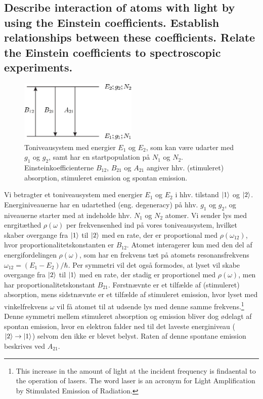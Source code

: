 \subsection{Describe interaction of atoms with light by using the Einstein coefficients. Establish relationships between these coefficients. Relate the Einstein coefficients to spectroscopic experiments.}


\begin{figure}[!h]
    \centering
    \includegraphics[width=0.5\textwidth]{Q02/images/TwoLevelSystem2.PNG}
    \caption{Toniveausystem med energier $E_1$ og $E_2$, som kan være udarter med $g_1$ og $g_2$, samt har en startpopulation på $N_1$ og $N_2$. Einsteinkoefficienterne $B_{12}$, $B_{21}$ og $A_{21}$ angiver hhv. (stimuleret) absorption, stimuleret emission og spontan emission.}
    \label{fig:Q02_TwoLevelSystem}
\end{figure}

Vi betragter et toniveausystem med energier $E_1$ og $E_2$ i hhv. tilstand $\ket{1}$ og $\ket{2}$. Energiniveauerne har en udartethed (eng. degeneracy) på hhv. $g_1$ og $g_2$, og niveauerne starter med at indeholde hhv. $N_1$ og $N_2$ atomer. Vi sender lys med enrgitæthed $\rho(\omega)$ per frekvensenhed ind på vores toniveausystem, hvilket skaber overgange fra $\ket{1}$ til $\ket{2}$ med en rate, der er proportional med $\rho(\omega_{12})$, hvor proportionalitetskonstanten er $B_{12}$. Atomet interagerer kun med den del af energifordelingen $\rho(\omega)$, som har en frekvens tæt på atomets \textsf{resonansfrekvens} $\omega_{12} = (E_1 - E_2)/\hbar$. Per symmetri vil det også formodes, at lyset vil skabe overgange fra $\ket{2}$ til $\ket{1}$ med en rate, der stadig er proportionel med $\rho(\omega)$, men har proportionalitetskonstant $B_{21}$. Førstnævnte er et tilfælde af (stimuleret) absorption, mens sidstnævnte er et tilfælde af stimuleret emission, hvor lyset med vinkelfrekvens $\omega$ vil få atomet til at udsende lys med denne samme frekvens.\footnote{This increase in the amount of light at the incident frequency is findaental to the operation of lasers. The word \textsf{laser} is an acronym for Light Amplification by Stimulated Emission of Radiation.} Denne symmetri mellem stimuleret absorption og emission bliver dog ødelagt af spontan emission, hvor en elektron falder ned til det laveste energiniveau ($\ket{2} \rightarrow \ket{1}$) selvom den ikke er blevet belyst. Raten af denne spontane emission beskrives ved $A_{21}$.

